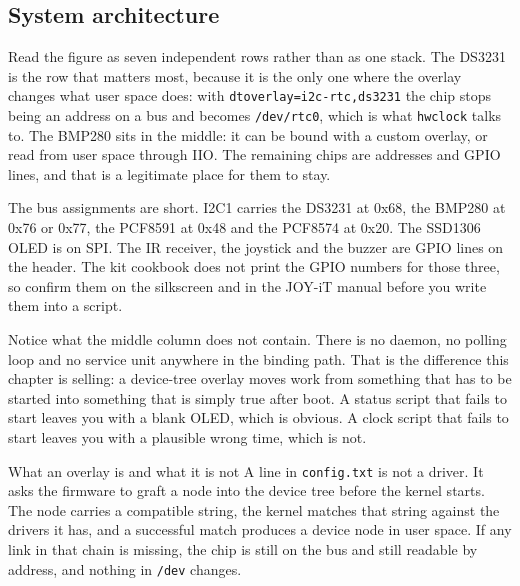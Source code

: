 \subsection*{System architecture}


Read the figure as seven independent rows rather than as one stack. The DS3231 is the row that matters most, because it is the only one where the overlay changes what user space does: with \texttt{dtoverlay=i2c-rtc,ds3231} the chip stops being an address on a bus and becomes \texttt{/dev/rtc0}, which is what \texttt{hwclock} talks to. The BMP280 sits in the middle: it can be bound with a custom overlay, or read from user space through IIO. The remaining chips are addresses and GPIO lines, and that is a legitimate place for them to stay.

The bus assignments are short. I2C1 carries the DS3231 at 0x68, the BMP280 at 0x76 or 0x77, the PCF8591 at 0x48 and the PCF8574 at 0x20. The SSD1306 OLED is on SPI. The IR receiver, the joystick and the buzzer are GPIO lines on the header. The kit cookbook does not print the GPIO numbers for those three, so confirm them on the silkscreen and in the JOY-iT manual before you write them into a script.

Notice what the middle column does not contain. There is no daemon, no polling loop and no service unit anywhere in the binding path. That is the difference this chapter is selling: a device-tree overlay moves work from something that has to be started into something that is simply true after boot. A status script that fails to start leaves you with a blank OLED, which is obvious. A clock script that fails to start leaves you with a plausible wrong time, which is not.

\begin{note}{What an overlay is and what it is not}
A line in \texttt{config.txt} is not a driver. It asks the firmware to graft a node into the device tree before the kernel starts. The node carries a compatible string, the kernel matches that string against the drivers it has, and a successful match produces a device node in user space. If any link in that chain is missing, the chip is still on the bus and still readable by address, and nothing in \texttt{/dev} changes.
\end{note}

